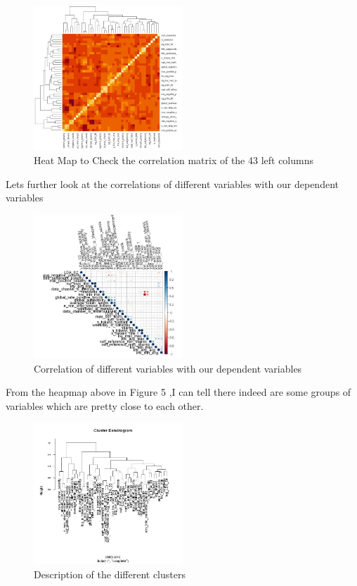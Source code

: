 \documentclass[sigchi]{acmart}
\begin{document}
\begin{figure}[h!]
    \caption{Heat Map to Check the correlation matrix of the 43 left columns}
    \centering
    \includegraphics[width=0.5\textwidth]{HeatMap.JPG}
\end{figure}

Lets further look at the correlations of different variables with our dependent variables

\begin{figure}[h!]
    \caption{Correlation of different variables with our dependent variables}
    \centering
    \includegraphics[width=0.5\textwidth]{VisualizingCorelationMatrix.JPG}
\end{figure}

From the heapmap above in Figure 5 ,I can tell there indeed are some groups of variables which are pretty close to each other.
\begin{figure}[h!]
    \caption{Description of the different clusters}
    \centering
    \includegraphics[width=0.5\textwidth]{ClusterDendogram.JPG}
\end{figure}
\end{document}
